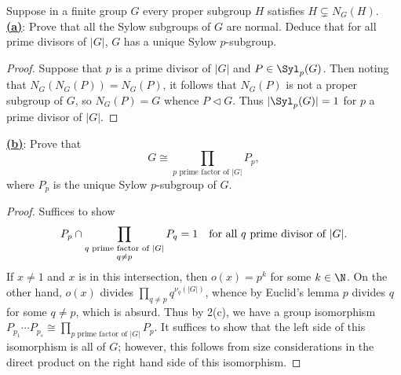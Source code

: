 \documentclass[12pt]{article}
\begin{document}
\begin{homeworkProblem}
  Suppose in a finite group $G$ every proper subgroup $H$ satisfies $H \subsetneq N_G(H)$.\\

  \underline{\textbf{(a)}}: Prove that all the Sylow subgroups of $G$ are normal. Deduce that for all prime divisors of $\lvert G\rvert$, $G$ has a unique Sylow $p$-subgroup.

  \begin{proof}
    Suppose that $ p $ is a prime divisor of $ |G| $ and $ P\in \Syl_{p}(G) $. Then noting that $ N_{G}(N_{G}(P)) = N_{G}(P) $, it follows that $ N_{G}(P) $ is not a proper subgroup of $ G $, so $ N_{G}(P) = G $ whence $ P\triangleleft G $. Thus $ |\Syl_{p}(G)| = 1 $ for $ p $ a prime divisor of $ |G| $.
  \end{proof}

  \underline{\textbf{(b)}}: Prove that
  \[
    G \cong \prod_{p \text{ prime factor of } \lvert G\rvert} P_p,
  \]
  where $P_p$ is the unique Sylow $p$-subgroup of $G$.

  \begin{proof}
    Suffices to show \[ P_{p}\cap \prod_{\substack{q \text{ prime factor of }|G|\\q\neq p}} P_{q} = 1\quad \text{for all $ q $ prime divisor of $ |G| $}.\] 
    If $ x\neq 1 $ and $ x $ is in this intersection, then $ o(x) = p^{k} $ for some $ k\in\N $. On the other hand, $ o(x) $ divides $ \prod_{q\neq p}q^{\nu_{q}(|G|)} $, whence by Euclid's lemma $ p $ divides $ q $ for some $ q\neq p $, which is absurd. Thus by 2(c), we have a group isomorphism 
    $P_{p_{1}}\cdots P_{p_{s}} \cong \prod_{p \text{ prime factor of } \lvert G\rvert} P_p$. It suffices to show that the left side of this isomorphism is all of $ G $; however, this follows from size considerations in the direct product on the right hand side of this isomorphism.
  \end{proof}

\end{homeworkProblem}
\end{document}
